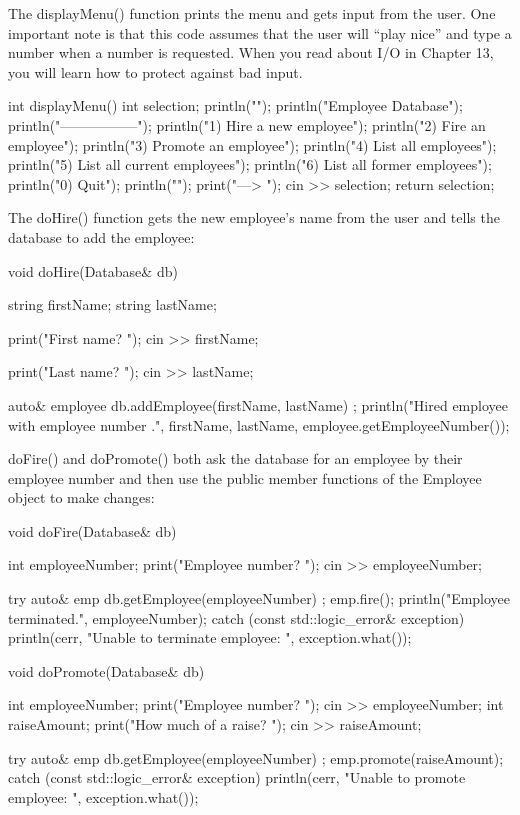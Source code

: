 The displayMenu() function prints the menu and gets input from the user. One important note is that this code assumes that the user will “play nice” and type a number when a number is requested. When you read about I/O in Chapter 13, you will learn how to protect against bad input.

\begin{cpp}
int displayMenu()
{
    int selection;
    println("");
    println("Employee Database");
    println("-----------------");
    println("1) Hire a new employee");
    println("2) Fire an employee");
    println("3) Promote an employee");
    println("4) List all employees");
    println("5) List all current employees");
    println("6) List all former employees");
    println("0) Quit");
    println("");
    print("---> ");
    cin >> selection;
    return selection;
}
\end{cpp}

The doHire() function gets the new employee’s name from the user and tells the database to add the employee:

\begin{cpp}
void doHire(Database& db)
{
    string firstName;
    string lastName;

    print("First name? ");
    cin >> firstName;

    print("Last name? ");
    cin >> lastName;

    auto& employee { db.addEmployee(firstName, lastName) };
    println("Hired employee {} {} with employee number {}.",
        firstName, lastName, employee.getEmployeeNumber());
}
\end{cpp}

doFire() and doPromote() both ask the database for an employee by their employee number and then use the public member functions of the Employee object to make changes:

\begin{cpp}
void doFire(Database& db)
{
    int employeeNumber;
    print("Employee number? ");
    cin >> employeeNumber;

    try {
        auto& emp { db.getEmployee(employeeNumber) };
        emp.fire();
        println("Employee {} terminated.", employeeNumber);
    } catch (const std::logic_error& exception) {
        println(cerr, "Unable to terminate employee: {}", exception.what());
    }
}

void doPromote(Database& db)
{
    int employeeNumber;
    print("Employee number? ");
    cin >> employeeNumber;
    int raiseAmount;
    print("How much of a raise? ");
    cin >> raiseAmount;

    try {
        auto& emp { db.getEmployee(employeeNumber) };
        emp.promote(raiseAmount);
    } catch (const std::logic_error& exception) {
        println(cerr, "Unable to promote employee: {}", exception.what());
    }
}
\end{cpp}

